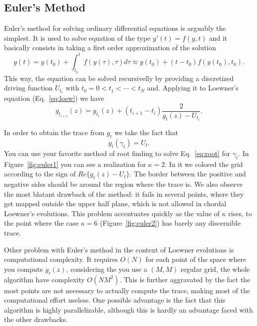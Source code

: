 \subsection{Euler's Method}
\label{ss:euler}

Euler's method for solving ordinary differential equations is arguably the
simplest. It is used to solve equation of the type $y'(t) = f(y, t)$ and it
basically consists in taking a first order approximation of the solution
\begin{equation}
    \newcommand{\y}[1]{y\left(#1\right)}
    \newcommand{\f}[1]{f\left(#1\right)}
    \y{t} = \y{t_0} + \int_{t_0}^t \f{\y{\tau}, \tau} d\tau \approx
            \y{t_0} + \left(t - t_0\right)\f{\y{t_0}, t_0}.
\end{equation}
This way, the equation can be solved recursivelly by providing a discretized
driving function $U_{t_i}$ with $t_0 = 0 < t_{1}<\cdots<t_N$ and. Applying it
to Loewner's equation (Eq.~\ref{eq:loew}) we have
\begin{equation}
    g_{t_{i+1}}(z) = g_{t_i}(z) + (t_{i+1} - t_i) \frac{2}{g_t(z) - U_{t_i}}.
\end{equation}

In order to obtain the trace from $g_t$ we take the fact that
\begin{equation}
    g_t(\gamma_t) = U_t.
    \label{eq:root}
\end{equation}
You can use your favorite method of root finding to solve Eq.~\ref{eq:root} for
$\gamma_t$. In Figure~\ref{fig:euler1} you can see a realization for
$\kappa=2$. In it we colored the grid according to the sign of
$Re\{g_t(z)-U_t\}$. The border between the positive and negative sides should
be around the region where the trace is. We also observe the most blatant
drawback of the method: it fails in several points, where they get mapped
outside the upper half plane, which is not allowed in chordal Loewner's
evolutions. This problem accentuates quickly as the value of $\kappa$ rises,
to the point where the case $\kappa=6$ (Figure~\ref{fig:euler2}) has barely
any discernible trace.

Other problem with Euler's method in the context of Loewner evolutions is
computational complexity. It requires $O(N)$ for each point of the space where
you compute $g_t(z)$, considering the you use a $(M,M)$ regular grid, the whole
algorithm have complexity $O(NM^2)$. This is further aggravated by the fact the
most points are not necessary to actually compute the trace, making most of the
computational effort useless. One possible advantage is the fact that this
algorithm is highly parallelizable, although this is hardly an advantage faced
with the other drawbacks.

